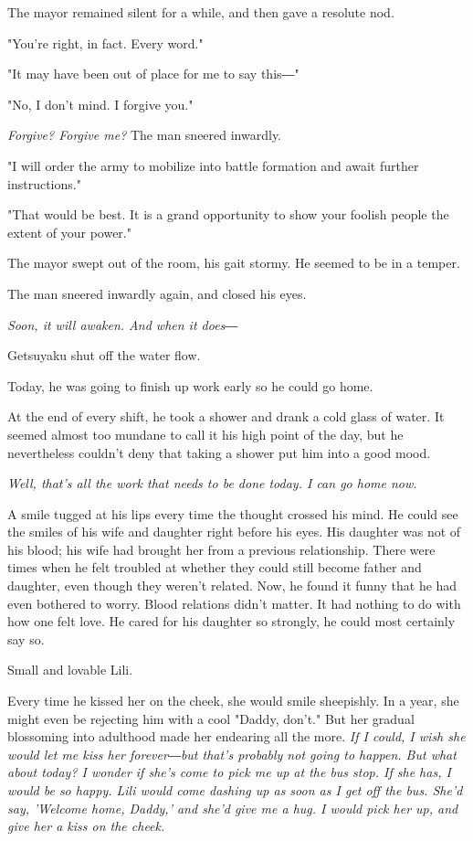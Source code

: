 The mayor remained silent for a while, and then gave a resolute nod.

"You're right, in fact. Every word."

"It may have been out of place for me to say this―"

"No, I don't mind. I forgive you."

\emph{Forgive? Forgive me?} The man sneered inwardly.

"I will order the army to mobilize into battle formation and await
further instructions."

"That would be best. It is a grand opportunity to show your foolish
people the extent of your power."

The mayor swept out of the room, his gait stormy. He seemed to be in a
temper.

The man sneered inwardly again, and closed his eyes.

\emph{Soon, it will awaken. And when it does―}

\myspace

Getsuyaku shut off the water flow.

Today, he was going to finish up work early so he could go home.

At the end of every shift, he took a shower and drank a cold glass of
water. It seemed almost too mundane to call it his high point of the
day, but he nevertheless couldn't deny that taking a shower put him into
a good mood.

\emph{Well, that's all the work that needs to be done today. I can go home
now.}

A smile tugged at his lips every time the thought crossed his mind. He
could see the smiles of his wife and daughter right before his eyes. His
daughter was not of his blood; his wife had brought her from a previous
relationship. There were times when he felt troubled at whether they
could still become father and daughter, even though they weren't
related. Now, he found it funny that he had even bothered to worry.
Blood relations didn't matter. It had nothing to do with how one felt
love. He cared for his daughter so strongly, he could most certainly say
so.

Small and lovable Lili.

Every time he kissed her on the cheek, she would smile sheepishly. In a
year, she might even be rejecting him with a cool "Daddy, don't." But
her gradual blossoming into adulthood made her endearing all the more.
\emph{If I could, I wish she would let me kiss her forever―but that's probably
not going to happen. But what about today? I wonder if she's come to
pick me up at the bus stop. If she has, I would be so happy. Lili would
come dashing up as soon as I get off the bus. She'd say, 'Welcome home,
Daddy,' and she'd give me a hug. I would pick her up, and give her a
kiss on the cheek.}


